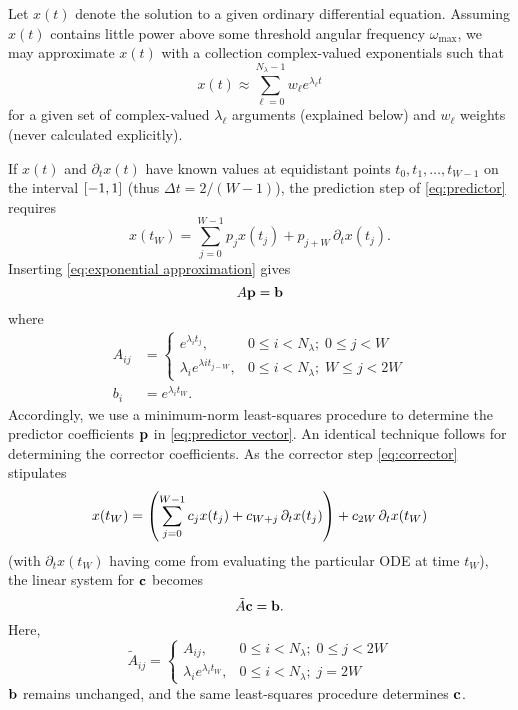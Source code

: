 Let $x(t)$ denote the solution to a given ordinary differential equation.
Assuming $x(t)$ contains little power above some threshold angular frequency $\omega_\text{max}$, we may approximate $x(t)$ with a collection complex-valued exponentials such that
\begin{equation}
  x(t) \approx \sum_{\ell = 0}^{N_\lambda - 1} w_\ell e^{\lambda_\ell t}
  \label{eq:exponential approximation}
\end{equation}
for a given set of complex-valued $\lambda_\ell$ arguments (explained below) and $w_\ell$ weights (never calculated explicitly).

If $x(t)$ and $\partial_t x(t)$ have known values at equidistant points $t_0, t_1, \ldots, t_{W - 1}$ on the interval $\qty[-1, 1]$ (thus $\Delta t = 2/(W - 1)$), the prediction step of \cref{eq:predictor} requires
\begin{equation}
  x(t_W) = \sum_{j = 0}^{W - 1} p_j x(t_j) + p_{j + W} \, \partial_t x(t_j).
\end{equation}
Inserting \cref{eq:exponential approximation} gives
\begin{equation}
  A \vb{p} = \vb{b}
  \label{eq:predictor vector}
\end{equation}
where
\begin{subequations}
\begin{align}
  A_{ij} &= \begin{cases}
    e^{\lambda_i t_j}, & 0 \leqslant i < N_\lambda; \; 0 \leqslant j < W \\
    \lambda_i e^{\lambda i t_{j - W}}, & 0 \leqslant i < N_\lambda; \; W \leqslant j < 2 W
  \end{cases} \\
  b_i &= e^{\lambda_i t_W}.
\end{align}
\end{subequations}
Accordingly, we use a minimum-norm least-squares procedure to determine the predictor coefficients $\vb{p}$ in \cref{eq:predictor vector}.
An identical technique follows for determining the corrector coefficients.
As the corrector step \cref{eq:corrector} stipulates
\begin{equation}
  x(t_W) = \qty(\sum_{j = 0}^{W - 1} c_j x(t_j) + c_{W + j} \, \partial_t x(t_j)) + c_{2W} \, \partial_t x(t_W)
\end{equation}
(with $\partial_t x(t_W)$ having come from evaluating the particular ODE at time $t_W$), the linear system for $\vb{c}$ becomes
\begin{equation}
  \tilde{A} \vb{c} = \vb{b}.
\end{equation}
Here,
\begin{equation}
  \tilde{A}_{ij} = \begin{cases}
    A_{ij}, & 0 \leqslant i < N_\lambda; \; 0 \leqslant j < 2W \\
    \lambda_i e^{\lambda_i t_W}, & 0 \leqslant i < N_\lambda; \; j = 2W
  \end{cases}
\end{equation}
$\vb{b}$ remains unchanged, and the same least-squares procedure determines $\vb{c}$.


